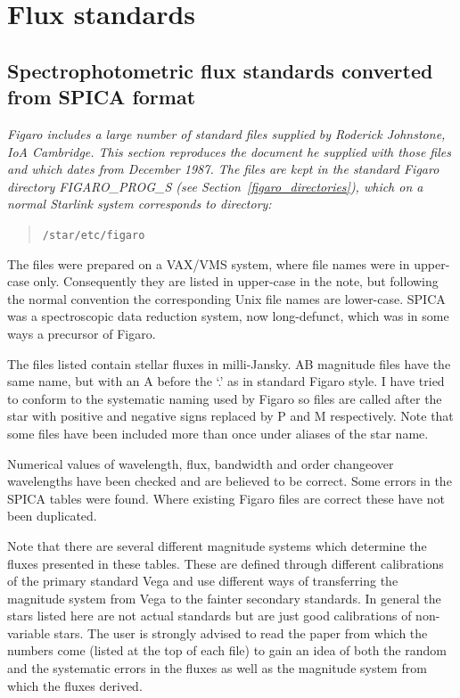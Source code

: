 \documentclass[11pt,twoside]{article}
\newcommand{\stardocinitials}  {SUN}
\newcommand{\stardocnumber}    { 86.21}
\newcommand{\stardocname}{\stardocinitials /\stardocnumber}
\newcommand{\htmlref}[2]{#1}
\newcommand{\xlabel}[1]{}
\newcommand{\latorhtm}[2]{#1}
\newcommand{\latorhtm}[2]{#2}
\begin{document}
\newpage %
\section{\xlabel{flux_standards}Flux standards}
\markboth{Flux standards}{\stardocname}


\subsection{\label{standard1}Spectrophotometric flux standards converted from SPICA format}

{\em
   Figaro includes a large number of standard files supplied by Roderick
   Johnstone, IoA Cambridge.  This section reproduces the document he
   supplied with those files and which dates from December 1987.  The
   files are kept in the standard Figaro directory
\latorhtm{FIGARO\_PROG\_S (see Section~\ref{figaro_directories}),}
{\htmlref{FIGARO\_PROG\_S}{figaro_directories},}
   which on a normal Starlink system corresponds to directory:

  \begin{quote}
   {\tt /star/etc/figaro}
  \end{quote}

   The files were prepared on a VAX/VMS system, where file names were
   in upper-case only.  Consequently they are listed in upper-case in the
   note, but following the normal convention the corresponding Unix file
   names are lower-case.  SPICA was a spectroscopic data reduction system,
   now long-defunct, which was in some ways a precursor of Figaro.
\/}

   The files listed contain stellar fluxes in milli-Jansky. AB
   magnitude files have the same name, but with an A before the `.' as
   in standard Figaro style. I have tried to conform to the systematic
   naming used by Figaro so files are called after the star with
   positive and negative signs replaced by P and M respectively. Note
   that some files have been included more than once under aliases of
   the star name.

   Numerical values of wavelength, flux, bandwidth and order changeover
   wavelengths have been checked and are believed to be correct. Some
   errors in the SPICA tables were found. Where existing Figaro files
   are correct these have not been duplicated.

   Note that there are several different magnitude systems which
   determine the fluxes presented in these tables. These are defined
   through different calibrations of the primary standard Vega and use
   different ways of transferring the magnitude system from Vega to the
   fainter secondary standards. In general the stars listed here are not
   actual standards but are just good calibrations of non-variable
   stars. The user is strongly advised to read the paper from which the
   numbers come (listed at the top of each file) to gain an idea of both
   the random and the systematic errors in the fluxes as well as the
   magnitude system from which the fluxes derived.
\end{document}
